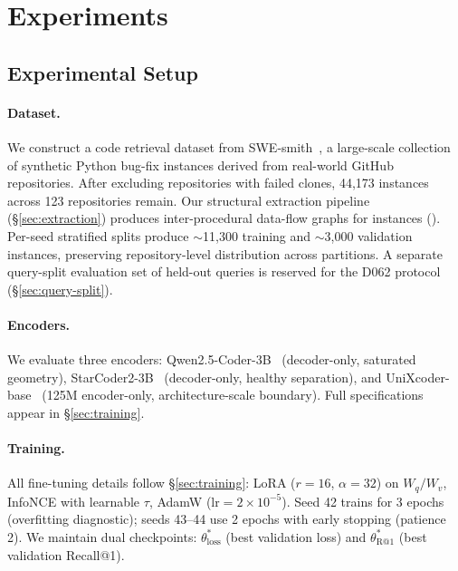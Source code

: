 \section{Experiments}
\label{sec:experiments}

\subsection{Experimental Setup}
\label{sec:setup}

\paragraph{Dataset.}
We construct a code retrieval dataset from SWE-smith~\cite{yang2025swesmith}, a large-scale collection of synthetic Python bug-fix instances derived from real-world GitHub repositories.
After excluding repositories with failed clones, 44,173 instances across 123 repositories remain.
Our structural extraction pipeline (\S\ref{sec:extraction}) produces inter-procedural data-flow graphs for  instances ().
Per-seed stratified splits produce $\sim$11,300 training and $\sim$3,000 validation instances, preserving repository-level distribution across partitions.
A separate query-split evaluation set of  held-out queries is reserved for the D062 protocol (\S\ref{sec:query-split}).

\paragraph{Encoders.}
We evaluate three encoders: Qwen2.5-Coder-3B~\cite{hui2024qwen25coder} (decoder-only, saturated geometry), StarCoder2-3B~\cite{lozhkov2024starcoder2} (decoder-only, healthy separation), and UniXcoder-base~\cite{guo2022unixcoder} (125M encoder-only, architecture-scale boundary).
Full specifications appear in \S\ref{sec:training}.

\paragraph{Training.}
All fine-tuning details follow \S\ref{sec:training}: LoRA ($r{=}16$, $\alpha{=}32$) on $W_q/W_v$, InfoNCE with learnable $\tau$, AdamW ($\text{lr}{=}2{\times}10^{-5}$).
Seed 42 trains for 3 epochs (overfitting diagnostic); seeds 43--44 use 2 epochs with early stopping (patience 2).
We maintain dual checkpoints: $\theta^*_{\text{loss}}$ (best validation loss) and $\theta^*_{\text{R@1}}$ (best validation Recall@1).


